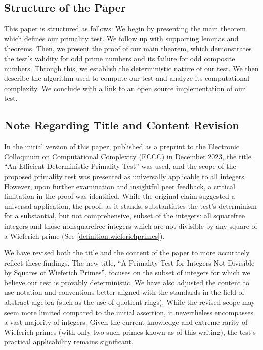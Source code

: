 \documentclass{article}
\theoremstyle{plain}
\theoremstyle{definition}
\begin{document}
\subsection{Structure of the Paper}
This paper is structured as follows: We begin by presenting the main theorem which defines our primality test. We follow up with supporting lemmas and theorems. Then, we present the proof of our main theorem, which demonstrates the test's validity for odd prime numbers and its failure for odd composite numbers. Through this, we establish the deterministic nature of our test. We then describe the algorithm used to compute our test and analyze its computational complexity. We conclude with a link to an open source implementation of our test.

\subsection{Note Regarding Title and Content Revision}
In the initial version of this paper, published as a preprint to the Electronic Colloquium on Computational Complexity (ECCC) in December 2023, the title ``An Efficient Deterministic Primality Test'' was used, and the scope of the proposed primality test was presented as universally applicable to all integers. However, upon further examination and insightful peer feedback, a critical limitation in the proof was identified. While the original claim suggested a universal application, the proof, as it stands, substantiates the test's determinism for a substantial, but not comprehensive, subset of the integers: all squarefree integers and those nonsquarefree integers which are not divisible by any square of a Wieferich prime (See \cref{definition:wieferichprimes}).

We have revised both the title and the content of the paper to more accurately reflect these findings. The new title, ``A Primality Test for Integers Not Divisible by Squares of Wieferich Primes'', focuses on the subset of integers for which we believe our test is provably deterministic. We have also adjusted the content to use notation and conventions better aligned with the standards in the field of abstract algebra (such as the use of quotient rings). While the revised scope may seem more limited compared to the initial assertion, it nevertheless encompasses a vast majority of integers. Given the current knowledge and extreme rarity of Wieferich primes (with only two such primes known as of this writing), the test's practical applicability remains significant.
\end{document}
